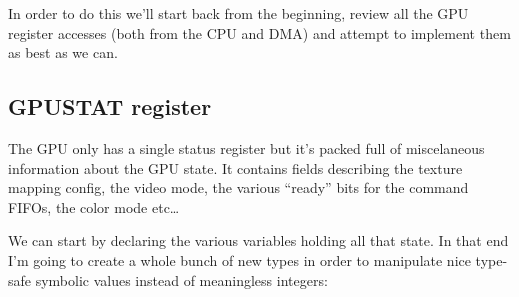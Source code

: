 \documentclass[a4paper]{article}
\begin{document}
In order to do this we'll start back from the beginning, review all
the GPU register accesses (both from the CPU and DMA) and attempt to
implement them as best as we can.

\subsection{GPUSTAT register}

The GPU only has a single status register but it's packed full of
miscelaneous information about the GPU state. It contains fields
describing the texture mapping config, the video mode, the various
``ready'' bits for the command FIFOs, the color mode etc\dots{}

We can start by declaring the various variables holding all that
state. In that end I'm going to create a whole bunch of new types in
order to manipulate nice type-safe symbolic values instead of
meaningless integers:
\end{document}
